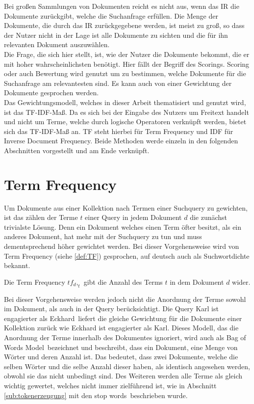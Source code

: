 Bei großen Sammlungen von Dokumenten reicht es nicht aus, wenn das IR die Dokumente zurückgibt, welche die Suchanfrage erfüllen. Die Menge der Dokumente, die durch das IR zurückgegebene werden, ist meist zu groß, so dass der Nutzer nicht in der Lage ist alle Dokumente zu sichten und die für ihn relevanten Dokument auszuwählen.\\
Die Frage, die sich hier stellt, ist, wie der Nutzer die Dokumente bekommt, die er mit hoher wahrscheinlichsten benötigt. Hier fällt der Begriff des Scorings. Scoring oder auch Bewertung wird genutzt um zu bestimmen, welche Dokumente für die Suchanfrage am relevantesten sind. Es kann auch von einer Gewichtung der Dokumente gesprochen werden.\\
Das Gewichtungsmodell, welches in dieser Arbeit thematisiert und genutzt wird, ist das TF-IDF-Maß. Da es sich bei der Eingabe des Nutzers um Freitext handelt und nicht um Terme, welche durch logische Operatoren verknüpft werden, bietet sich das TF-IDF-Maß an. TF steht hierbei für Term Frequency und IDF für Inverse Document Frequency. Beide Methoden werde einzeln in den folgenden Abschnitten vorgestellt und am Ende verknüpft.

\section{Term Frequency}
Um Dokumente aus einer Kollektion nach Termen einer Suchquery zu gewichten, ist das zählen der Terme $t$ einer Query in jedem Dokument $d$ die zunächst trivialste Lösung. Denn ein Dokument welches einen Term öfter besitzt, als ein anderes Dokument, hat mehr mit der Suchquery zu tun und muss dementsprechend höher gewichtet werden. Bei dieser Vorgehensweise wird von Term Frequency (siehe \cref{def:TF}) gesprochen, auf deutsch auch als Suchwortdichte bekannt. \newpage
\begin{defi}\label{def:TF}
	Die Term Frequency $tf_d,_t$ gibt die Anzahl des Terms $t$ in dem Dokument $d$ wider.
\end{defi}
Bei dieser Vorgehensweise werden jedoch nicht die Anordnung der Terme sowohl im Dokument, als auch in der Query berücksichtigt. Die Query \glqq Karl ist engagierter als Eckhard\grqq\ liefert die gleiche Gewichtung für die Dokumente einer Kollektion zurück wie \glqq Eckhard ist engagierter als Karl\grqq . Dieses Modell, das die Anordnung der Terme innerhalb des Dokumentes ignoriert, wird auch als \glqq Bag of Words Model\grqq\ bezeichnet und beschreibt, dass ein Dokument, eine Menge von Wörter und deren Anzahl ist. Das bedeutet, dass zwei Dokumente, welche die selben Wörter und die selbe Anzahl dieser haben, als identisch angesehen werden, obwohl sie das nicht unbedingt sind. Des Weiteren werden alle Terme als gleich wichtig gewertet, welches nicht immer zielführend ist, wie in Abschnitt \ref{sub:tokenerzeugung} mit den \glqq stop words\grqq\ beschrieben wurde.

